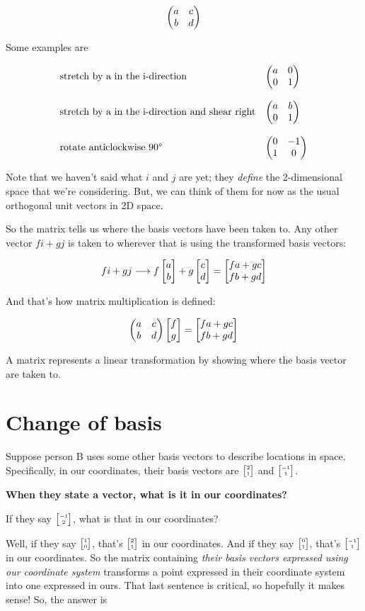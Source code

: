 $$
\begin{pmatrix}a & c\\b & d\\ \end{pmatrix}
$$

Some examples are

$$
\begin{array}{ll}
\text{stretch by a in the i-direction} & \begin{pmatrix}a & 0\\0 & 1\\ \end{pmatrix}
\\\\
\text{stretch by a in the i-direction and shear right} & \begin{pmatrix}a & b\\0 & 1\\ \end{pmatrix}
\\\\
\text{rotate anticlockwise 90°} & \begin{pmatrix}0 & -1\\1 &  0\\ \end{pmatrix}
\end{array}
$$

Note that we haven't said what $i$ and $j$ are yet; they \textit{define} the
2-dimensional space that we're considering. But, we can think of them for now
as the usual orthogonal unit vectors in 2D space.

So the matrix tells us where the basis vectors have been taken to. Any other
vector $fi + gj$ is taken to wherever that is using the transformed basis
vectors:

$$
fi + gj \longrightarrow f\begin{bmatrix}a\\b\end{bmatrix} + g\begin{bmatrix}c\\d\end{bmatrix} = \begin{bmatrix}fa + gc\\fb + gd\end{bmatrix}
$$


And that's how matrix multiplication is defined:

$$
\begin{pmatrix}a & c\\b & d\\ \end{pmatrix} \begin{bmatrix}f\\g\end{bmatrix} = \begin{bmatrix}fa + gc\\fb + gd\end{bmatrix}
$$


A matrix represents a linear transformation by showing where the basis vector
are taken to.


\section{Change of basis}

Suppose person B uses some other basis vectors to describe locations in
space. Specifically, in our coordinates, their basis vectors are
$\tiny{\begin{bmatrix}2\\1\end{bmatrix}}$ and $\tiny{\begin{bmatrix}-1\\1\end{bmatrix}}$.


\textbf{When they state a vector, what is it in our coordinates?}

If they say $\tiny{\begin{bmatrix}-1\\2\end{bmatrix}}$, what is that in our coordinates?

Well, if they say $\tiny{\begin{bmatrix}1\\0\end{bmatrix}}$, that's $\tiny{\begin{bmatrix}2\\1\end{bmatrix}}$ in our coordinates. And
if they say $\tiny{\begin{bmatrix}0\\1\end{bmatrix}}$, that's $\tiny{\begin{bmatrix}-1\\1\end{bmatrix}}$ in our coordinates. So the
matrix containing \textit{their basis vectors expressed using our coordinate system}
transforms a point expressed in their coordinate system into one expressed in
ours. That last sentence is critical, so hopefully it makes sense! So, the answer is

